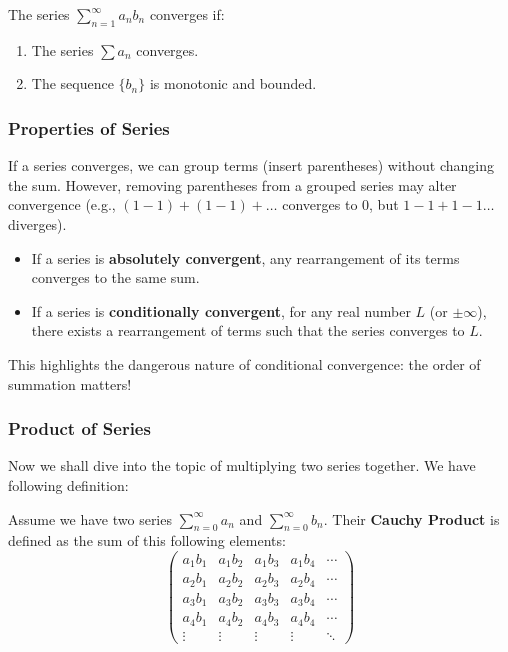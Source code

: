 \documentclass[oneside]{book}
\begin{document}
\begin{theorem}
The series $\sum_{n=1}^{\infty} a_n b_n$ converges if:
\begin{enumerate}
    \item The series $\sum a_n$ converges.
    \item The sequence $\{b_n\}$ is monotonic and bounded.
\end{enumerate}
\end{theorem}

\subsubsection{Properties of Series}

\begin{theorem}[Associativity]
If a series converges, we can group terms (insert parentheses) without changing the sum. However, removing parentheses from a grouped series may alter convergence (e.g., $(1-1)+(1-1)+\dots$ converges to 0, but $1-1+1-1\dots$ diverges).
\end{theorem}

\begin{theorem}
\begin{itemize}
    \item If a series is \textbf{absolutely convergent}, any rearrangement of its terms converges to the same sum.
    \item If a series is \textbf{conditionally convergent}, for any real number $L$ (or $\pm \infty$), there exists a rearrangement of terms such that the series converges to $L$.
\end{itemize}
This highlights the dangerous nature of conditional convergence: the order of summation matters!
\end{theorem}

\subsubsection{Product of Series}
Now we shall dive into the topic of multiplying two series together. We have following definition:

\begin{definition}
    Assume we have two series $\sum_{n=0}^{\infty} a_n$ and $\sum_{n=0}^{\infty} b_n$. Their \textbf{Cauchy Product} is defined as the sum of this following elements:
    \[\begin{pmatrix}
        a_1 b_1 & a_1 b_2 & a_1 b_3 & a_1 b_4 & \cdots \\
        a_2 b_1 & a_2 b_2 & a_2 b_3 & a_2 b_4 & \cdots \\
        a_3 b_1 & a_3 b_2 & a_3 b_3 & a_3 b_4 & \cdots \\
        a_4 b_1 & a_4 b_2 & a_4 b_3 & a_4 b_4 & \cdots \\
    \vdots   & \vdots   & \vdots   & \vdots   & \ddots
    \end{pmatrix}\]
\end{definition}
\end{document}
